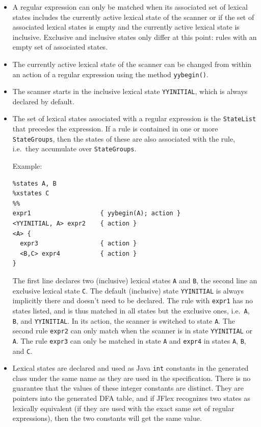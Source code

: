 \documentclass[11pt]{scrartcl}
\begin{document}
\begin{itemize}
\item
A regular expression can only be matched when its associated set of lexical
states includes the currently active lexical state of the scanner or if
the set of associated lexical states is empty and the currently active lexical
state is inclusive. Exclusive and inclusive states only differ at this point: 
rules with an empty set of associated states.
 
\item
The currently active lexical state of the scanner can be changed from within
an action of a regular expression using the method \texttt{yybegin()}.
 

\item
The scanner starts in the inclusive lexical state 
\texttt{YYINITIAL}, which is always declared by default.
 

\item
The set of lexical states associated with a regular expression is 
the \texttt{StateList} that precedes the expression. If a rule is
contained in one or more \texttt{StateGroups}, then the states of
these are also associated with the rule, i.e.~they accumulate over
\texttt{StateGroups}.
  
Example:
\begin{verbatim}
%states A, B
%xstates C
%%
expr1                   { yybegin(A); action }
<YYINITIAL, A> expr2    { action }
<A> {
  expr3                 { action }
  <B,C> expr4           { action }
}
\end{verbatim}
The first line declares two (inclusive) lexical states \texttt{A} and \texttt{B},
the second line an exclusive lexical state \texttt{C}.
The default (inclusive) state \texttt{YYINITIAL} is always implicitly there and
doesn't need to be declared. The rule with \texttt{expr1} has no
states listed, and is thus matched in all states but the exclusive
ones, i.e.~\texttt{A}, \texttt{B}, and \texttt{YYINITIAL}. In its
action, the scanner is switched to state \texttt{A}. The second rule
\texttt{expr2} can only match when the scanner is in state
\texttt{YYINITIAL} or \texttt{A}. The rule \texttt{expr3} can only be
matched in state \texttt{A} and \texttt{expr4} in states \texttt{A}, \texttt{B},
and \texttt{C}.

\item
Lexical states are declared and used as Java \texttt{int} constants in
the generated class under the same name as they are used in the specification.
There is no guarantee that the values of these integer constants are
distinct. They are pointers into the generated DFA table, and if JFlex
recognizes two states as lexically equivalent (if they are used with the
exact same set of regular expressions), then the two constants will get
the same value.
 
\end{itemize}
\end{document}
